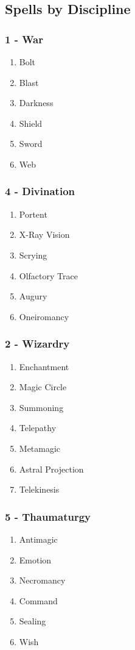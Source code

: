 \subsection{Spells by Discipline}
\label{sec:spell-list}
\begin{multicols}{3}
\subsubsection*{1 - War}
\begin{enumerate}
    \item {Bolt}
    \item {Blast}
    \item {Darkness}
    \item {Shield}
    \item {Sword}
    \item {Web}
\end{enumerate}
\subsubsection*{4 - Divination }
\begin{enumerate}
    \item {Portent}
    \item {X-Ray Vision}
    \item {Scrying}
    \item {Olfactory Trace}
    \item {Augury}
    \item {Oneiromancy}
\end{enumerate}
\subsubsection*{2 - Wizardry}
\begin{enumerate}
    \item {Enchantment}
    \item {Magic Circle}
    \item {Summoning}
    \item {Telepathy}
    \item {Metamagic}
    \item {Astral Projection}
    \item {Telekinesis}
\end{enumerate}
\subsubsection*{5 - Thaumaturgy }
\begin{enumerate}
    \item {Antimagic}
    \item {Emotion}
    \item {Necromancy}
    \item {Command}
    \item {Sealing}
    \item {Wish}
\end{enumerate}

\end{multicols}
